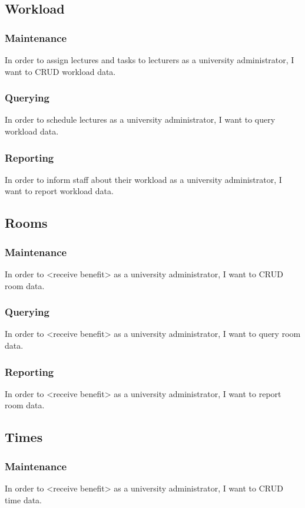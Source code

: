 \subsection{Workload}
\subsubsection{Maintenance}
In order to assign lectures and tasks to lecturers as a university administrator,
I want to CRUD workload data.

\subsubsection{Querying}
In order to schedule lectures as a university administrator, I want to query
workload data.

\subsubsection{Reporting}
In order to inform staff about their workload as a university administrator, I
want to report workload data.

\subsection{Rooms}
\subsubsection{Maintenance}
In order to <receive benefit> as a university administrator, I want to CRUD room data.
\subsubsection{Querying}
In order to <receive benefit> as a university administrator, I want to query room data.
\subsubsection{Reporting}
In order to <receive benefit> as a university administrator, I want to report room data.
\subsection{Times}
\subsubsection{Maintenance}
In order to <receive benefit> as a university administrator, I want to CRUD time data.
